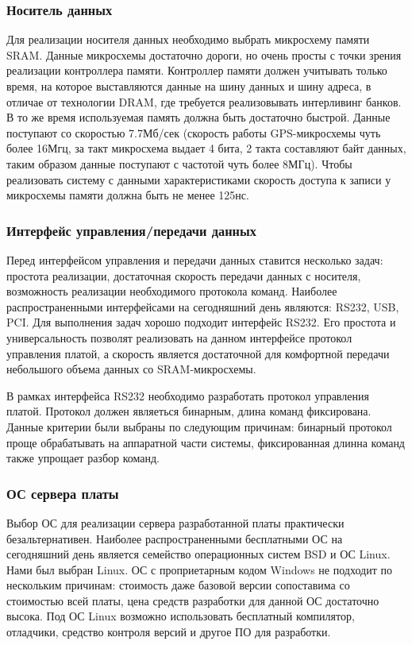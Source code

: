 \subsubsection*{Носитель данных}
\label{razdel1_sram}
Для реализации носителя данных необходимо выбрать микросхему памяти SRAM. Данные микросхемы достаточно дороги,
но очень просты с точки зрения реализации контроллера памяти. Контроллер памяти должен учитывать только время,
на которое выставляются данные на шину данных и шину адреса, в отличае от технологии DRAM, где требуется реализовывать
интерливинг банков. В то же время используемая память должна быть достаточно быстрой. Данные поступают со
скоростью 7.7Мб/сек (скорость работы GPS-микросхемы чуть более 16Мгц, за такт микросхема выдает 4 бита, 2 такта
составляют байт данных, таким образом данные поступают с частотой чуть более 8МГц). Чтобы реализовать систему
с данными характеристиками скорость доступа к записи у микросхемы памяти должна быть не менее 125нс.

\subsubsection*{Интерфейс управления/передачи данных}
\label{razdel1_rs232}
Перед интерфейсом управления и передачи данных ставится несколько задач: простота реализации, достаточная скорость передачи данных с
носителя, возможность реализации необходимого протокола команд. Наиболее распространенными интерфейсами на сегодняшний день
являются: RS232, USB, PCI. Для выполнения задач хорошо подходит интерфейс RS232. Его простота и универсальность позволят
реализовать на данном интерфейсе протокол управления платой, а скорость является достаточной для комфортной передачи 
небольшого объема данных со SRAM-микросхемы.

В рамках интерфейса RS232 необходимо разработать протокол управления платой. Протокол должен являеться
бинарным, длина команд фиксирована.
Данные критерии были выбраны по следующим причинам: бинарный протокол проще обрабатывать на аппаратной части системы,
фиксированная длинна команд также упрощает разбор команд. 

\subsubsection*{ОС сервера платы}
\label{razdel1_os}
Выбор ОС для реализации сервера разработанной платы практически безальтернативен. Наиболее распространенными бесплатными ОС
на сегодняшний день является семейство операционных систем BSD и ОС Linux. Нами был выбран Linux. ОС с проприетарным кодом Windows
не подходит по нескольким причинам: стоимость даже базовой версии сопоставима со стоимостью всей платы, цена средств разработки
для данной ОС достаточно высока. Под ОС Linux возможно использовать бесплатный компилятор, отладчики, средство контроля версий
и другое ПО для разработки.

